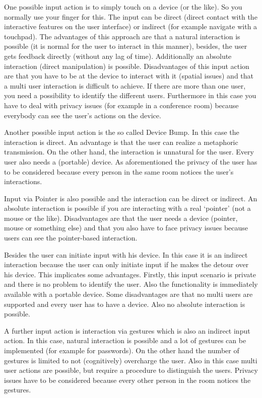 \documentclass{acm_proc_article-sp}
\begin{document}
One possible input action is to simply touch on a device (or the like).
So you normally use your finger for this.
The input can be direct (direct contact with the interactive features on the user interface) or indirect (for example navigate with a touchpad).
The advantages of this approach are that a natural interaction is possible (it is normal for the user to interact in this manner), besides, the user gets feedback directly (without any lag of time). Additionally an absolute interaction (direct manipulation) is possible.
Disadvantages of this input action are that you have to be at the device to interact with it (spatial issues) and that a multi user interaction is difficult to achieve.
If there are more than one user, you need a possibility to identify the different users.
Furthermore in this case you have to deal with privacy issues (for example in a conference room) because everybody can see the user’s actions on the device.

Another possible input action is the so called Device Bump.
In this case the interaction is direct.
An advantage is that the user can realize a metaphoric transmission.
On the other hand, the interaction is unnatural for the user.
Every user also needs a (portable) device.
As aforementioned the privacy of the user has to be considered because every person in the same room notices the user’s interactions. 

Input via Pointer is also possible and the interaction can be direct or indirect.
An absolute interaction is possible if you are interacting with a real ‘pointer’ (not a mouse or the like).
Disadvantages are that the user needs a device (pointer, mouse or something else) and that you also have to face privacy issues because users can see the pointer-based interaction.

Besides the user can initiate input with his device.
In this case it is an indirect interaction because the user can only initiate input if he makes the detour over his device. This implicates some advantages.
Firstly, this input scenario is private and there is no problem to identify the user.
Also the functionality is immediately available with a portable device.
Some disadvantages are that no multi users are supported and every user has to have a device.
Also no absolute interaction is possible.

A further input action is interaction via gestures which is also an indirect input action.
In this case, natural interaction is possible and a lot of gestures can be implemented (for example for passwords).
On the other hand the number of gestures is limited to not (cognitively) overcharge the user.
Also in this case multi user actions are possible, but require a procedure to distinguish the users.
Privacy issues have to be considered because every other person in the room notices the gestures.
\end{document}
